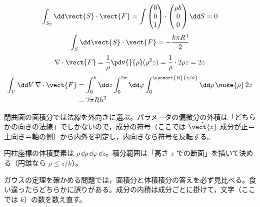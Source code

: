 \[ \int_{S_{2}}\dd\vect{S}\cdot\vect{F}=\int\begin{pmatrix}0\\0\\1\end{pmatrix}\cdot\begin{pmatrix}\rho h\\0\\0\end{pmatrix}\dd S=0 \]
\[ \int_{S}\dd\vect{S}\cdot\vect{F}=-\frac{k\pi R^{4}}{2} \]
\[ \nabla\cdot\vect{F}=\frac{1}{\rho}\pdv{}{\rho}(\rho^{2}z)=\frac{1}{\rho}\cdot2\rho z=2z \]
\begin{align*}
\int_{V}\dd V\,\nabla\cdot\vect{F}&=\int_{0}^{h}\dd z\int_{0}^{2\pi}\dd\varphi\int_{0}^{\ayamari{R}{z/k}}\dd\rho\,\nuke{\rho}\,2z\\
&=2\pi Rh^{2}
\end{align*}
\item 閉曲面の面積分では法線を外向きに選ぶ。パラメータの偏微分の外積は「どちらかの向きの法線」でしかないので，成分の符号（ここでは $\hat{\vect{z}}$ 成分が正＝上向き＝軸の側）から内外を判定し，内向きなら符号を反転する。
\item 円柱座標の体積要素は $\rho\,\dd\rho\,\dd\varphi\,\dd z$。積分範囲は「高さ $z$ での断面」を描いて決める（円錐なら $\rho\le z/k$）。
\item ガウスの定理を確かめる問題では，面積分と体積積分の答えを必ず見比べる。食い違ったらどちらかに誤りがある。成分の内積は成分ごとに掛けて，文字（ここでは $k$）の数を数え直す。
